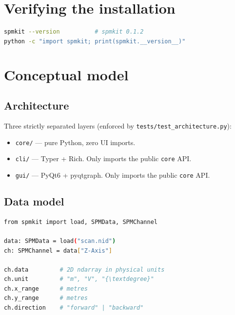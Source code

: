 \documentclass[a4paper,11pt]{article}
\begin{document}
\section{Verifying the installation}

\begin{lstlisting}[language=bash]
spmkit --version          # spmkit 0.1.2
python -c "import spmkit; print(spmkit.__version__)"
\end{lstlisting}

\section{Conceptual model}

\subsection{Architecture}

Three strictly separated layers (enforced by \texttt{tests/test\_architecture.py}):

\begin{itemize}[nosep]
  \item \texttt{core/} --- pure Python, zero UI imports.
  \item \texttt{cli/} --- Typer + Rich. Only imports the public \texttt{core} API.
  \item \texttt{gui/} --- PyQt6 + pyqtgraph. Only imports the public \texttt{core} API.
\end{itemize}

\subsection{Data model}

\begin{lstlisting}[language=bash]
from spmkit import load, SPMData, SPMChannel

data: SPMData = load("scan.nid")
ch: SPMChannel = data["Z-Axis"]

ch.data         # 2D ndarray in physical units
ch.unit         # "m", "V", "{\textdegree}"
ch.x_range      # metres
ch.y_range      # metres
ch.direction    # "forward" | "backward"
\end{lstlisting}
\end{document}
